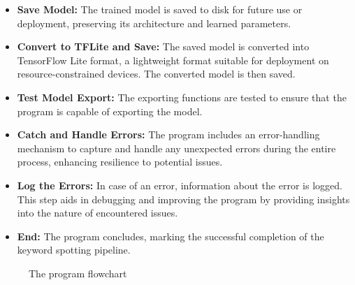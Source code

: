 \begin{itemize}
	\item \textbf{Save Model:} The trained model is saved to disk for future use or deployment, preserving its architecture and learned parameters.
	
	\item \textbf{Convert to TFLite and Save:} The saved model is converted into TensorFlow Lite format, a lightweight format suitable for deployment on resource-constrained devices. The converted model is then saved.
	
	\item \textbf{Test Model Export:} The exporting functions are tested to ensure that the program is capable of exporting the model.
	
	\item \textbf{Catch and Handle Errors:} The program includes an error-handling mechanism to capture and handle any unexpected errors during the entire process, enhancing resilience to potential issues.
	
	\item \textbf{Log the Errors:} In case of an error, information about the error is logged. This step aids in debugging and improving the program by providing insights into the nature of encountered issues.
	
	\item \textbf{End:} The program concludes, marking the successful completion of the keyword spotting pipeline.
\end{itemize}


\begin{figure}[h!]
	\centering
	
	\caption{The program flowchart} \label{fig:progFlowchart}
\end{figure}

